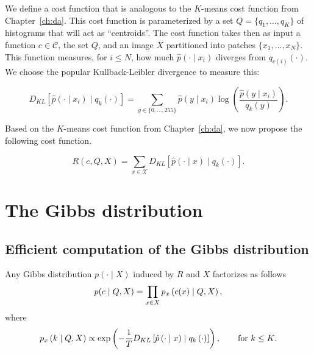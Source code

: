 We define a cost function that is analogous to the $K$-means cost function
from Chapter~\ref{ch:da}. This cost function is parameterized by a set $Q = \{q_1, \ldots, q_K\}$ of histograms that will act as ``centroids''. The cost function
takes then as input a function $c \in \mathcal{C}$, the set $Q$, and an image $X$ partitioned
into patches $\{x_1, \dots, x_N\}$. This function measures, for $i \leq N$, how much
$\hat{p}\left(\cdot \mid x_i\right)$ diverges from $q_{c(i)}\left(\cdot\right)$. We choose the popular Kullback-Leibler divergence
to measure this:

\begin{equation}
D_{KL}\left[\hat{p}\left(\cdot \mid x_i\right) \mid q_k\left(\cdot\right)\right] = \sum_{y \in \{0, \ldots, 255\}} \hat{p}\left(y \mid x_i\right) \log \left(\frac{\hat{p}\left(y \mid x_i\right)}{q_k\left(y\right)}\right).
\end{equation}

Based on the $K$-means cost function from Chapter~\ref{ch:da}, we now propose the following cost function.

\begin{definition}
\begin{equation}
R(c, Q, X) = \sum_{x \in \mathcal{X}} D_{KL}\left[\hat{p}\left(\cdot \mid x\right) \mid q_k\left(\cdot\right)\right].
\end{equation}
\end{definition}

\section{The Gibbs distribution}

\subsection{Efficient computation of the Gibbs distribution}

\begin{lemma}
Any Gibbs distribution $p(\cdot \mid X)$ induced by $R$ and $X$ factorizes as follows
%
\begin{equation}
p(c \mid Q, X) = \prod_{x \in X} p_{x} \left(c(x)\mid Q, X\right),
\end{equation}
%
where
%
\begin{equation}
p_{x} \left(k\mid Q, X\right) \propto \exp\left(-\frac{1}{T}D_{KL}\left[\hat{p}\left(\cdot \mid x\right) \mid q_{k}\left(\cdot \right)\right]\right), \qquad \text{for $k \leq K$}.
\end{equation}
%
\end{lemma}

